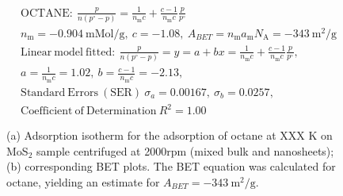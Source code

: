 

\begin{align*}
&\mathrm{OCTANE:}\ \frac{p}{n(p^\circ-p)}=\frac{1}{n_\mathrm{m}c}+\frac{c-1}{n_\mathrm{m}c}\frac{p}{p^\circ}\\
&{n_\mathrm{m}}=-0.904\ \mathrm{mMol/g},\ c=-1.08,\ A_{BET}={n_\mathrm{m}}{a_\mathrm{m}}{N_\mathrm{A}}=-343\ \mathrm{m}^2\mathrm{/g}\\
&\mathrm{Linear\ model\ fitted:}\ \frac{p}{n(p^\circ-p)}=y=a+bx=\frac{1}{n_\mathrm{m}c}+\frac{c-1}{n_\mathrm{m}c}\frac{p}{p^\circ},\\
&a=\frac{1}{n_\mathrm{m}c}=1.02,\ b=\frac{c-1}{n_\mathrm{m}c}=-2.13,\\
&\mathrm{Standard\ Errors\ (SER)}\ \sigma_a=0.00167,\ \sigma_b=0.0257,\\
&\mathrm{Coefficient\ of\ Determination}\ R^2 = 1.00
\end{align*}


\begin{figure}[htb]
\hfill
{}
\caption{(a) Adsorption isotherm for the adsorption of octane at XXX K on MoS$_2$ 
sample centrifuged at 2000rpm (mixed bulk and nanosheets);
(b) corresponding BET plots. The BET equation was calculated for octane, yielding an estimate for $A_{BET}=-343\ \mathrm{m}^2\mathrm{/g}$.}

\label{fig:sa-Nanosheets-Prep-II-4000rpm-3mg-01-3mm-50C-S1-SE-10ml}
\end{figure}


